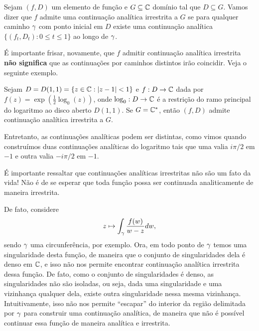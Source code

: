     \begin{definicao}
    \label{def-continuacao-irrestrita}
        Sejam $(f,D)$ um elemento de função e $G\subseteq\mathbb{C}$ domínio tal que 
        $D\subseteq G$. Vamos dizer que $f$ admite uma continuação analítica irrestrita a 
        $G$ se para qualquer caminho $\gamma$ com ponto inicial em $D$ existe uma continuação
        analítica $\{(f_t, D_t) : 0\leq t\leq 1\}$ ao longo de $\gamma$.
    \end{definicao}

    É importante frisar, novamente, que $f$ admitir continuação analítica irrestrita 
    \textbf{não significa} que as continuações por caminhos distintos irão coincidir.
    Veja o seguinte exemplo.

    \begin{exemplo}
        Sejam $D = D(1,1) = \{ z\in\mathbb{C} : |z-1|<1 \}$ e $f:D\to\mathbb{C}$ dada por
        $f(z) = \displaystyle{\exp\left( \frac{1}{2}\log_0(z) \right)}$, onde
        $\log_0:D\to\mathbb{C}$ é a restrição do ramo principal do logaritmo ao disco aberto
        $D(1,1)$. Se $G = \mathbb{C}^*$, então $(f,D)$ admite continuação analítica irrestrita
        a $G$.
        
        Entretanto, as continuações analíticas podem ser distintas, como vimos quando
        construímos duas continuações analíticas do logaritmo tais que uma valia 
        $i\pi/2$ em $-1$ e outra valia $-i\pi/2$ em $-1$.
    \end{exemplo}

    \begin{observacao}
        É importante ressaltar que continuações analíticas irrestritas não são um fato da vida!
        Não é de se esperar que toda função possa ser continuada analiticamente de maneira
        irrestrita.
        
        De fato, considere
        \begin{equation*}
            z \mapsto \int_\gamma \frac{f(w)}{w-z} dw,
        \end{equation*}
        sendo $\gamma$ uma circunferência, por exemplo. Ora, em todo ponto de $\gamma$
        temos uma singularidade desta função, de maneira que o conjunto de singularidades
        dela é denso em $\mathbb{C}$, e isso não nos permite encontrar continuação analítica 
        irrestrita dessa função. De fato, como o conjunto de singularidades é denso, as 
        singularidades não são isoladas, ou seja, dada uma singularidade e uma vizinhança
        qualquer dela, existe outra singularidade nessa mesma vizinhança. Intuitivamente, 
        isso não nos permite ``escapar'' do interior da região delimitada por $\gamma$ para
        construir uma continuação analítica, de maneira que não é possível continuar 
        essa função de maneira analítica e irrestrita.
    \end{observacao}

